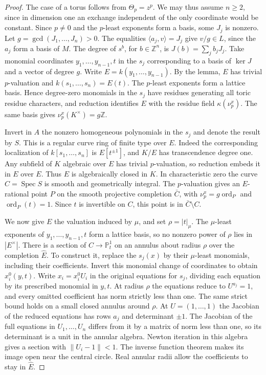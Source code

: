 \documentclass[11pt,reqno]{amsart}
\numberwithin{equation}{section}
\theoremstyle{definition}
\theoremstyle{remark}
\DeclareMathOperator{\Spec}{Spec}
\DeclareMathOperator{\ord}{ord}
\begin{document}
\begin{proof}
The case of a torus follows from \(\Theta_p=z^p\). We may thus
assume \(n\ge2\), since in dimension one an exchange independent
of the only coordinate would be constant. Since \(p\ne0\) and the
\(p\)-least exponents form a basis, some \(J_j\) is nonzero. Let
\(g=\gcd(J_1,\ldots,J_n)>0\). The equalities
\(\langle a_j,v\rangle=J_j\) give \(v/g\in L\), since the \(a_j\)
form a basis of \(M\). The degree of \(s^b\), for \(b\in\mathbb Z^n\),
is \(J(b)=\sum_j b_jJ_j\). Take monomial
coordinates \(y_1,\ldots,y_{n-1},t\)
in the \(s_j\) corresponding to a basis of \(\ker J\) and a vector
of degree \(g\). Write \(E=k(y_1,\ldots,y_{n-1})\). By the lemma,
\(E\) has trivial \(p\)-valuation and \(k(s_1,\ldots,s_n)=E(t)\).
The \(p\)-least exponents form a lattice basis. Hence degree-zero
monomials in the \(s_j\) have residues generating all toric residue
characters, and reduction identifies \(E\) with the residue field
\(\kappa(\nu^x_p)\).
The same basis gives \(\nu^x_p(K^\times)=g\mathbb Z\).

Invert in \(A\) the nonzero homogeneous polynomials in the \(s_j\)
and denote the result by \(S\). This is a regular curve ring of
finite type over \(E\). Indeed the corresponding localization of
\(k[s_1,\ldots,s_n]\) is \(E[t^{\pm1}]\), and \(K/E\) has
transcendence degree one. Any subfield of \(K\) algebraic over \(E\)
has trivial \(p\)-valuation, so reduction embeds it in \(E\) over
\(E\). Thus \(E\) is algebraically closed in \(K\). In characteristic
zero the curve \(C=\Spec S\) is smooth and geometrically integral.
The \(p\)-valuation gives an \(E\)-rational point \(P\) on the
smooth projective completion \(\bar C\), with
\(\nu^x_p=g\ord_P\) and \(\ord_P(t)=1\). Since \(t\) is invertible
on \(C\), this point is in \(\bar C\setminus C\).

We now give \(E\) the valuation induced by \(\mu\), and set
\(\rho=|t|_\mu\). The \(\mu\)-least exponents of \(y_1,\ldots,y_{n-1},t\)
form a lattice basis, so no nonzero power of \(\rho\) lies in
\(|E^\times|\). There is a section of \(C\to\mathbb P^1_t\)
on an annulus about radius \(\rho\) over the completion \(\widehat E\).
To construct it, replace the \(s_j(x)\) by their \(\mu\)-least
monomials, including their coefficients. Invert this monomial change
of coordinates to obtain \(x^0_i(y,t)\). Write \(x_i=x^0_i U_i\)
in the original equations for \(s_j\), dividing each equation by
its prescribed monomial in \(y,t\). At radius \(\rho\) the equations
reduce to \(U^{a_j}=1\), and every omitted coefficient has norm
strictly less than one. The same strict bound holds on a small
closed annulus around \(\rho\). At \(U=(1,\ldots,1)\) the Jacobian
of the reduced equations has rows \(a_j\) and determinant \(\pm1\).
The Jacobian of the full equations in \(U_1,\ldots,U_n\) differs
from it by a matrix of norm less than one, so its determinant is
a unit in the annular algebra. Newton iteration in this algebra gives
a section with \(\lVert U_i-1\rVert<1\). The inverse function
theorem makes its image open near the central circle. Real annular
radii allow the coefficients to stay in \(\widehat E\).


\end{proof}
\end{document}
